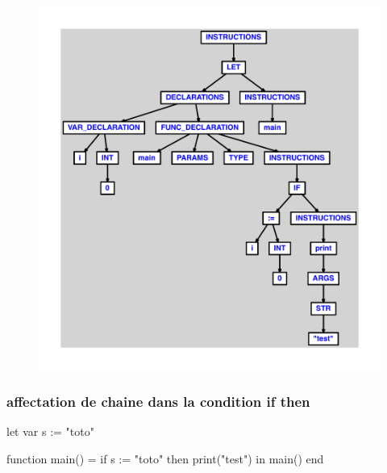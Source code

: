 \documentclass{article}
\begin{document}
\begin{figure}[H]\centering\includegraphics[max width=\textwidth]{ast/ast_240.pdf}\end{figure}\subsubsection{affectation de chaine dans la condition if then}
\begin{verbatimtab}
let
	var s := "toto"

	function main() =
		if s := "toto" then
			print("test")
in main() end
\end{verbatimtab}
\end{document}
